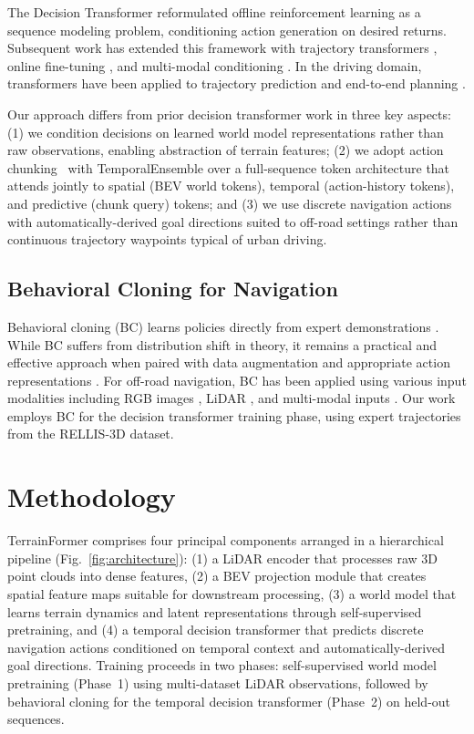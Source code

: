 \documentclass[journal]{IEEEtran}
\begin{document}
The Decision Transformer \cite{chen2021} reformulated offline reinforcement learning as a sequence modeling problem, conditioning action generation on desired returns. Subsequent work has extended this framework with trajectory transformers \cite{janner2021}, online fine-tuning \cite{zheng2022}, and multi-modal conditioning \cite{xu2022}. In the driving domain, transformers have been applied to trajectory prediction \cite{nayakanti2023} and end-to-end planning \cite{hu2023}.

Our approach differs from prior decision transformer work in three key aspects: (1) we condition decisions on learned world model representations rather than raw observations, enabling abstraction of terrain features; (2) we adopt action chunking~\cite{zhao2023act} with TemporalEnsemble over a full-sequence token architecture that attends jointly to spatial (BEV world tokens), temporal (action-history tokens), and predictive (chunk query) tokens; and (3) we use discrete navigation actions with automatically-derived goal directions suited to off-road settings rather than continuous trajectory waypoints typical of urban driving.

\subsection{Behavioral Cloning for Navigation}

Behavioral cloning (BC) learns policies directly from expert demonstrations \cite{pomerleau1989, bojarski2016}. While BC suffers from distribution shift in theory, it remains a practical and effective approach when paired with data augmentation and appropriate action representations \cite{codevilla2018}. For off-road navigation, BC has been applied using various input modalities including RGB images \cite{kahn2021}, LiDAR \cite{wigness2019}, and multi-modal inputs \cite{triest2023}. Our work employs BC for the decision transformer training phase, using expert trajectories from the RELLIS-3D dataset.

\section{Methodology}
\label{sec:methodology}

TerrainFormer comprises four principal components arranged in a hierarchical pipeline (Fig.~\ref{fig:architecture}): (1) a LiDAR encoder that processes raw 3D point clouds into dense features, (2) a BEV projection module that creates spatial feature maps suitable for downstream processing, (3) a world model that learns terrain dynamics and latent representations through self-supervised pretraining, and (4) a temporal decision transformer that predicts discrete navigation actions conditioned on temporal context and automatically-derived goal directions. Training proceeds in two phases: self-supervised world model pretraining (Phase~1) using multi-dataset LiDAR observations, followed by behavioral cloning for the temporal decision transformer (Phase~2) on held-out sequences.
\end{document}
